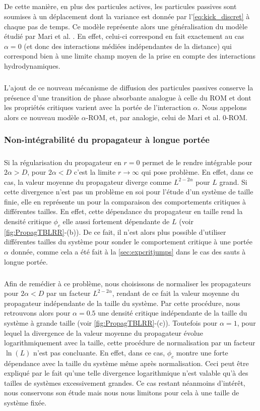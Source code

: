 \subparagraph{}De cette manière, en plus des particules actives, les particules passives sont soumises à un déplacement dont la variance est donnée par l'\autoref{eq:kick_discret} à chaque pas de temps. Ce modèle représente alors une généralisation du modèle étudié par Mari et al. \cite{mari_absorbing_2022}. En effet, celui-ci correspond en fait exactement au cas $\alpha = 0$ (et donc des interactions médiées indépendantes de la distance) qui correspond bien à une limite champ moyen de la prise en compte des interactions hydrodynamiques.

\subparagraph{}L'ajout de ce nouveau mécanisme de diffusion des particules passives conserve la présence d'une transition de phase absorbante analogue à celle du ROM et dont les propriétés critiques varient avec la portée de l'interaction $\alpha$. Nous appelons alors ce nouveau modèle $\alpha$-ROM, et, par analogie, celui de Mari et al. 0-ROM. 

\subsubsection{Non-intégrabilité du propagateur à longue portée}

\label{sec:noninteg}

\subparagraph{}Si la régularisation du propagateur en $r=0$ permet de le rendre intégrable pour $2\alpha > D$, pour $2\alpha<D$ c'est la limite $r\rightarrow\infty$ qui pose problème. En effet, dans ce cas, la valeur moyenne du propagateur diverge comme $L^{2-2\alpha}$ pour $L$ grand. Si cette divergence n'est pas un problème en soi pour l'étude d'un système de taille finie, elle en représente un pour la comparaison des comportements critiques à différentes tailles. En effet, cette dépendance du propagateur en taille rend la densité critique $\phi_c$ elle aussi fortement dépendante de $L$ (voir \autoref{fig:PropagTBLRR}-(b)). De ce fait, il n'est alors plus possible d'utiliser différentes tailles du système pour sonder le comportement critique à une portée $\alpha$ donnée, comme cela a été fait à la \autoref{sec:expcritjumps} dans le cas des sauts à longue portée.

\subparagraph{}Afin de remédier à ce problème, nous choisissons de normaliser les propagateurs pour $2\alpha<D$ par un facteur $L^{2-2\alpha}$, rendant de ce fait la valeur moyenne du propagateur indépendante de la taille du système. Par cette procédure, nous retrouvons alors pour $\alpha = 0.5$ une densité critique indépendante de la taille du système à grande taille (voir \autoref{fig:PropagTBLRR}-(c)). Toutefois pour $\alpha = 1$, pour lequel la divergence de la valeur moyenne du propagateur évolue logarithmiquement avec la taille, cette procédure de normalisation par un facteur $\ln (L)$ n'est pas concluante. En effet, dans ce cas, $\phi_c$ montre une forte dépendance avec la taille du système même après normalisation. Ceci peut être expliqué par le fait qu'une telle divergence logarithmique n'est valable qu'à des tailles de systèmes excessivement grandes. Ce cas restant néanmoins d'intérêt, nous conservons son étude mais nous nous limitons pour cela à une taille de système fixée.

